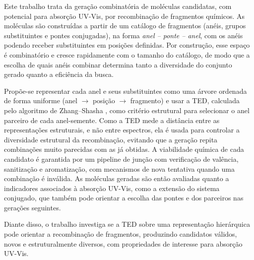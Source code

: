 Este trabalho trata da geração combinatória de moléculas candidatas, com potencial para absorção UV-Vis, por recombinação de fragmentos químicos. As moléculas são construídas a partir de um catálogo de fragmentos (anéis, grupos substituintes e pontes conjugadas), na forma \textit{anel -- ponte -- anel}, com os anéis podendo receber substituintes em posições definidas. Por construção, esse espaço é combinatório e cresce rapidamente com o tamanho do catálogo, de modo que a escolha de quais anéis combinar determina tanto a diversidade do conjunto gerado quanto a eficiência da busca.

Propõe-se representar cada anel e seus substituintes como uma árvore ordenada de forma uniforme (anel $\rightarrow$ posição $\rightarrow$ fragmento) e usar a TED, calculada pelo algoritmo de Zhang--Shasha \cite{zhang_shasha_1989}, como critério estrutural para selecionar o anel parceiro de cada anel-semente. Como a TED mede a distância entre as representações estruturais, e não entre espectros, ela é usada para controlar a diversidade estrutural da recombinação, evitando que a geração repita combinações muito parecidas com as já obtidas. A viabilidade química de cada candidato é garantida por um pipeline de junção com verificação de valência, sanitização e aromatização, com mecanismos de nova tentativa quando uma combinação é inválida. As moléculas geradas são então avaliadas quanto a indicadores associados à absorção UV-Vis, como a extensão do sistema conjugado, que também pode orientar a escolha das pontes e dos parceiros nas gerações seguintes.

Diante disso, o trabalho investiga se a TED sobre uma representação hierárquica pode orientar a recombinação de fragmentos, produzindo candidatos válidos, novos e estruturalmente diversos, com propriedades de interesse para absorção UV-Vis.
